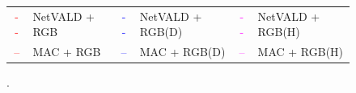 \begin{figure}
\begin{minipage}{0.65\linewidth}
   		\vspace{0.2cm}
   		
   		\begin{footnotesize}
   			\setlength{\tabcolsep}{2pt}
   			\begin{tabular}{c l c l c l}
   				\textcolor{red}{\Large{- -}} & NetVALD + RGB & \textcolor{blue}{\Large{- -}} & NetVALD + RGB(D)  & \textcolor{magenta}{\Large{- -}} & NetVALD + RGB(H)\\
   				\textcolor{red}{\Large{--}} & MAC + RGB & \textcolor{blue}{\Large{--}} & MAC + RGB(D) & \textcolor{magenta}{\Large{--}} & MAC + RGB(H)\\
   			\end{tabular}		
   		\end{footnotesize}
   		
   	\end{minipage}\hfill
   	\begin{minipage}{0.35\linewidth}
   		\caption[]{\label{fig:ratio_t_knn} .}
   	\end{minipage}	
	
	
	
\end{figure}